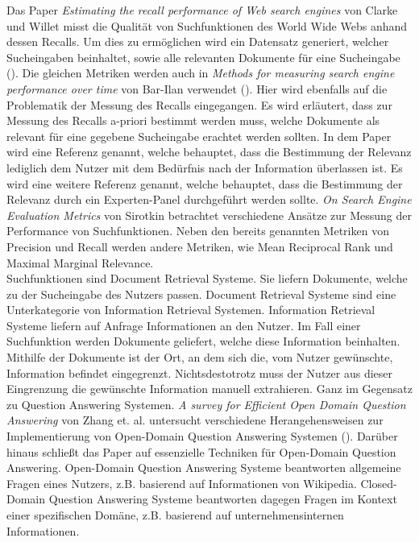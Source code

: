 Das Paper \textit{Estimating the recall performance of Web search engines} von Clarke und Willet misst die Qualität von Suchfunktionen des World Wide Webs anhand dessen Recalls.
Um dies zu ermöglichen wird ein Datensatz generiert, welcher Sucheingaben beinhaltet, sowie alle relevanten Dokumente für eine Sucheingabe (\cite{Clarke_Willett_1997}).
Die gleichen Metriken werden auch in \textit{Methods for measuring search engine performance over time} von Bar-Ilan verwendet (\cite{Bar-Ilan_2002}).
Hier wird ebenfalls auf die Problematik der Messung des Recalls eingegangen.
Es wird erläutert, dass zur Messung des Recalls a-priori bestimmt werden muss, welche Dokumente als relevant für eine gegebene Sucheingabe erachtet werden sollten.
In dem Paper wird eine Referenz genannt, welche behauptet, dass die Bestimmung der Relevanz lediglich dem Nutzer mit dem Bedürfnis nach der Information überlassen ist.
Es wird eine weitere Referenz genannt, welche behauptet, dass die Bestimmung der Relevanz durch ein Experten-Panel durchgeführt werden sollte.
\textit{On Search Engine Evaluation Metrics} von Sirotkin betrachtet verschiedene Ansätze zur Messung der Performance von Suchfunktionen.
Neben den bereits genannten Metriken von Precision und Recall werden andere Metriken, wie Mean Reciprocal Rank und Maximal Marginal Relevance.\\

Suchfunktionen sind Document Retrieval Systeme.
Sie liefern Dokumente, welche zu der Sucheingabe des Nutzers passen.
Document Retrieval Systeme sind eine Unterkategorie von Information Retrieval Systemen.
Information Retrieval Systeme liefern auf Anfrage Informationen an den Nutzer.
Im Fall einer Suchfunktion werden Dokumente geliefert, welche diese Information beinhalten.
Mithilfe der Dokumente ist der Ort, an dem sich die, vom Nutzer gewünschte, Information befindet eingegrenzt.
Nichtsdestotrotz muss der Nutzer aus dieser Eingrenzung die gewünschte Information manuell extrahieren.
Ganz im Gegensatz zu Question Answering Systemen.
\textit{A survey for Efficient Open Domain Question Answering} von Zhang et. al. untersucht verschiedene Herangehensweisen zur Implementierung von Open-Domain Question Answering Systemen (\cite{Zhang_Chen_Xu_Cao_Chen_Cohn_Fang_2023}).
Darüber hinaus schließt das Paper auf essenzielle Techniken für Open-Domain Question Answering.
Open-Domain Question Answering Systeme beantworten allgemeine Fragen eines Nutzers, z.B. basierend auf Informationen von Wikipedia.
Closed-Domain Question Answering Systeme beantworten dagegen Fragen im Kontext einer spezifischen Domäne, z.B. basierend auf unternehmensinternen Informationen.



